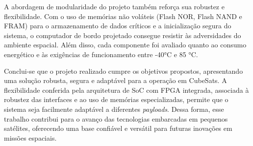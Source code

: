 A abordagem de modularidade do projeto também reforça sua robustez e flexibilidade. Com o uso de memórias não voláteis (Flash NOR, Flash NAND e FRAM) para o armazenamento de dados críticos e a inicialização segura do sistema, o computador de bordo projetado consegue resistir às adversidades do ambiente espacial. Além disso, cada componente foi avaliado quanto ao consumo energético e às exigências de funcionamento entre -40°C e 85 °C.

Conclui-se que o projeto realizado cumpre os objetivos propostos, apresentando uma solução robusta, segura e adaptável para a operação em CubeSats. A flexibilidade conferida pela arquitetura de SoC com FPGA integrada, associada à robustez das interfaces e ao uso de memórias especializadas, permite que o sistema seja facilmente adaptável a diferentes \textit{payloads}. Dessa forma, esse trabalho contribui para o avanço das tecnologias embarcadas em pequenos satélites, oferecendo uma base confiável e versátil para futuras inovações em missões espaciais.






